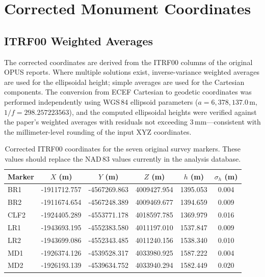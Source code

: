\documentclass[11pt,letterpaper]{article}
\begin{document}
\section{Corrected Monument Coordinates}

\subsection{ITRF00 Weighted Averages}

The corrected coordinates are derived from the ITRF00 columns of the original OPUS reports. Where multiple solutions exist, inverse-variance weighted averages are used for the ellipsoidal height; simple averages are used for the Cartesian components. The conversion from ECEF Cartesian to geodetic coordinates was performed independently using WGS\,84 ellipsoid parameters ($a = 6{,}378{,}137.0$\,m, $1/f = 298.257223563$), and the computed ellipsoidal heights were verified against the paper's weighted averages with residuals not exceeding 3\,mm---consistent with the millimeter-level rounding of the input XYZ coordinates.

\begin{table}[H]
\centering
\caption{Corrected ITRF00 coordinates for the seven original survey markers. These values should replace the NAD\,83 values currently in the analysis database.}
\label{tab:corrected}
\smallskip
\small
\begin{tabular}{@{}lS[table-format=-7.3]S[table-format=-7.3]S[table-format=7.3]S[table-format=4.3]S[table-format=1.3]@{}}
\toprule
{Marker} & {$X$ (m)} & {$Y$ (m)} & {$Z$ (m)} & {$h$ (m)} & {$\sigma_h$ (m)} \\
\midrule
BR1  & -1911712.757 & -4567269.863 & 4009427.954 & 1395.053 & 0.004 \\
BR2  & -1911674.654 & -4567248.389 & 4009469.677 & 1394.659 & 0.009 \\
CLF2 & -1924405.289 & -4553771.178 & 4018597.785 & 1369.979 & 0.016 \\
LR1  & -1943693.195 & -4552383.580 & 4011197.010 & 1537.847 & 0.009 \\
LR2  & -1943699.086 & -4552343.485 & 4011240.156 & 1538.340 & 0.010 \\
MD1  & -1926374.126 & -4539528.317 & 4033980.925 & 1587.222 & 0.004 \\
MD2  & -1926193.139 & -4539634.752 & 4033940.294 & 1582.449 & 0.020 \\
\bottomrule
\end{tabular}
\end{table}
\end{document}
